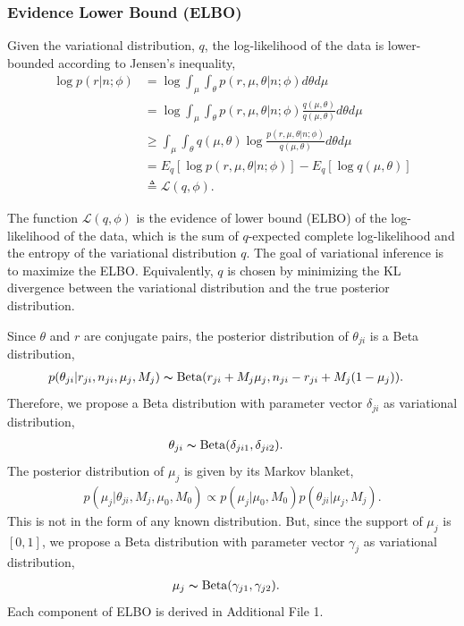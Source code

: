 \documentclass{bmcart}
\begin{document}
\subsubsection{Evidence Lower Bound (ELBO)}
Given the variational distribution, $q$, the log-likelihood of the data is lower-bounded according to Jensen's inequality,
\begin{equation}
\begin{split}
\log p \left( r | n; \phi \right) &= \log \int_\mu \int_\theta p\left(r,\mu,\theta |n; \phi \right) d\theta d\mu \\
&= \log \int_\mu \int_\theta p\left(r,\mu,\theta |n; \phi \right)\frac{q\left(\mu,\theta \right) }{q\left(\mu,\theta \right) } d\theta d\mu \\
&\geq \int_\mu \int_\theta q\left(\mu,\theta \right) \log \frac{ p\left(r,\mu,\theta |n; \phi \right)}{q\left(\mu,\theta \right)} d\theta d\mu \\
&= E_q \left[ \log p\left(r,\mu,\theta |n; \phi \right)\right] - E_q \left[ \log q\left(\mu,\theta \right)\right] \\
&\triangleq \mathcal{L}(q, \phi).
\end{split}
\end{equation}

The function $\mathcal{L}(q, \phi)$ is the evidence of lower bound (ELBO) of the log-likelihood of the data, which is the sum of $q$-expected complete log-likelihood and the entropy of the variational distribution $q$.
The goal of variational inference is to maximize the ELBO.
Equivalently, $q$ is chosen by minimizing the KL divergence between the variational distribution and the true posterior distribution.

Since $\theta$ and $r$ are conjugate pairs, the posterior distribution of $\theta_{ji}$ is a Beta distribution,
\begin{align}
&p(\theta_{ji}|r_{ji},n_{ji},\mu_j,M_j)
\thicksim \text{Beta}(r_{ji}+M_j \mu_j, n_{ji}-r_{ji}+M_j(1-\mu_j)).
\end{align}
Therefore, we propose a Beta distribution with parameter vector $\delta_{ji}$ as variational distribution,
\begin{align}
\theta_{ji} &\thicksim \text{Beta}(\delta_{ji1}, \delta_{ji2}) \nonumber.
\end{align}
%
The posterior distribution of $\mu_j$ is given by its Markov blanket,
\begin{align}
p(\mu_j|\theta_{ji},M_j,\mu_0,M_0)\propto p(\mu_j|\mu_0,M_0)p(\theta_{ji}|\mu_j,M_j).
\end{align}
This is not in the form of any known distribution.
But, since the support of $\mu_j$ is $[0,1]$, we propose a Beta distribution with parameter vector $\gamma_{j}$ as variational distribution,
\begin{align}
\mu_j &\thicksim \text{Beta}(\gamma_{j1}, \gamma_{j2}) \nonumber.
\end{align}
%
Each component of ELBO is derived in Additional File 1.
\end{document}
